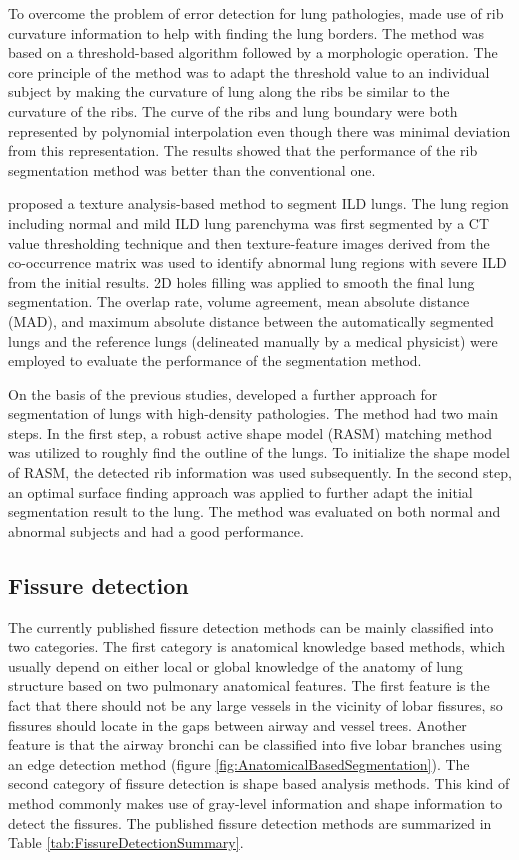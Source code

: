 To overcome the problem of error detection for lung pathologies, \cite{prasad2008automatic} made use of rib curvature information to help with finding the lung borders. The method was based on a threshold-based algorithm followed by a morphologic operation. The core principle of the method was to adapt the threshold value to an individual subject by making the curvature of lung along the ribs be similar to the curvature of the ribs. The curve of the ribs and lung boundary were both represented by polynomial interpolation even though there was minimal deviation from this representation. The results showed that the performance of the rib segmentation method was better than the conventional one.

\cite{wang2009automated} proposed a texture analysis-based method to segment ILD lungs. The lung region including normal and mild ILD lung parenchyma was first segmented by a CT value thresholding technique and then texture-feature images derived from the co-occurrence matrix was used to identify abnormal lung regions with severe ILD from the initial results. 2D holes filling was applied to smooth the final lung segmentation. The overlap rate, volume agreement, mean absolute distance (MAD), and maximum absolute distance between the automatically segmented lungs and the reference lungs (delineated manually by a medical physicist) were employed to evaluate the performance of the segmentation method.

On the basis of the previous studies, \citep{sun2012automated} developed a further approach for segmentation of lungs with high-density pathologies. The method had two main steps. In the first step, a robust active shape model (RASM) matching method was utilized to roughly find the outline of the lungs. To initialize the shape model of RASM, the detected rib information was used subsequently. In the second step, an optimal surface finding approach was applied to further adapt the initial segmentation result to the lung. The method was evaluated on both normal and abnormal subjects and had a good performance.
\subsection{Fissure detection}
The currently published fissure detection methods can be mainly classified into two categories. The first category is anatomical knowledge based methods, which usually depend on either local or global knowledge of the anatomy of lung structure based on two pulmonary anatomical features. The first feature is the fact that there should not be any large vessels in the vicinity of lobar fissures, so fissures should locate in the gaps between airway and vessel trees. Another feature is that the airway bronchi can be classified into five lobar branches using an edge detection method (figure \ref{fig:AnatomicalBasedSegmentation}). The second category of fissure detection is shape based analysis methods. This kind of method commonly makes use of gray-level information and shape information to detect the fissures. The published fissure detection methods are summarized in Table \ref{tab:FissureDetectionSummary}.

